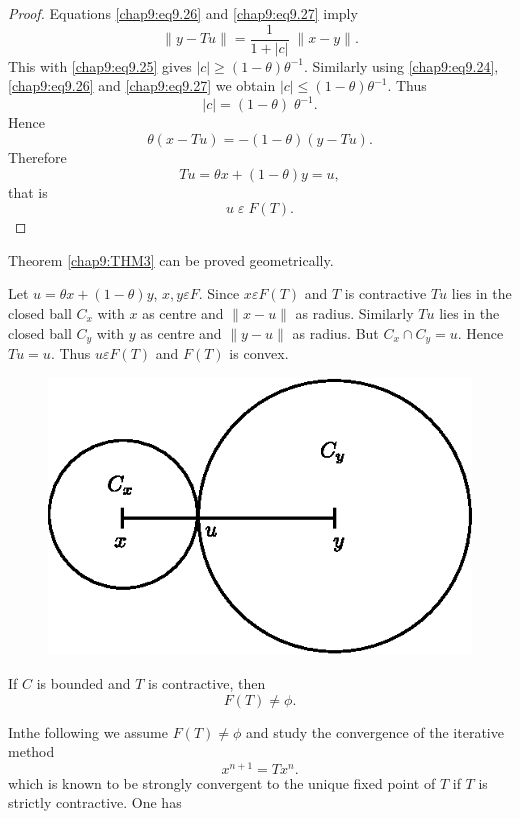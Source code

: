 \begin{proof}
Equations \eqref{chap9:eq9.26} and \eqref{chap9:eq9.27} imply
$$
\parallel y-Tu\parallel =\frac{1}{1+|c|}\;\parallel x-y\parallel.
$$
This with \eqref{chap9:eq9.25} gives $|c|\geq
(1-\theta)\theta^{-1}$. Similarly using \eqref{chap9:eq9.24},
\eqref{chap9:eq9.26} and \eqref{chap9:eq9.27} we obtain $|c|\leq
(1-\theta)\theta^{-1}$. Thus 
$$
|c|=(1-\theta)\;\theta^{-1}.
$$\pageoriginale
Hence
$$
\theta(x-Tu)=-(1-\theta)(y-Tu).
$$
Therefore
$$
Tu=\theta x+(1-\theta)y=u,
$$
that is 
$$
u\;\varepsilon \;F(T).
$$
\end{proof}

\setcounter{REM}{0}
\begin{REM}\label{chap9:rem1}
Theorem \ref{chap9:THM3} can be proved geometrically.

Let $u=\theta x+(1-\theta)y$, $x,y\varepsilon F$. Since $x\varepsilon
F(T)$ and $T$ is contractive $Tu$ lies in the closed ball $C_x$ with
$x$ as centre and $\parallel x-u\parallel$ as radius. Similarly $Tu$
lies in the closed ball $C_y$ with $y$ as centre and $\parallel
y-u\parallel$ as radius. But $C_x\cap C_y=u$. Hence $Tu=u$. Thus
$u\varepsilon F(T)$ and $F(T)$ is convex. 
\end{REM}
\begin{figure}[H]
\centering
\includegraphics{figure/fig9.2.eps}
\caption{}\label{fig9.2}
\end{figure}

If $C$ is bounded and $T$ is contractive, then 
$$
F(T)\neq \phi.
$$

In\pageoriginale the following we assume $F(T)\neq\phi$ and study the
convergence of the iterative method
$$
x^{n+1}=Tx^n.
$$
which is known to be strongly convergent to the unique fixed point of
$T$ if $T$ is strictly contractive. One has 

